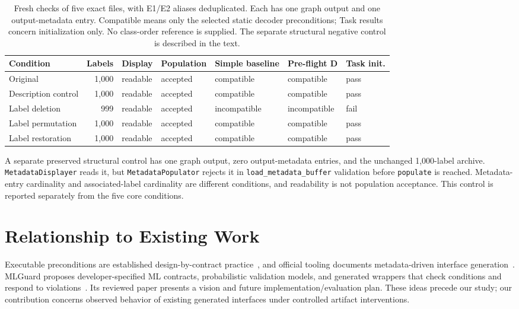 \documentclass[10pt,twocolumn,letterpaper]{article}
\newcommand{\code}[1]{\texttt{#1}}
\begin{document}
\begin{table}[t]
\centering\small
\setlength{\tabcolsep}{7pt}
\begin{tabular}{@{}lrlllll@{}}
\toprule
Condition & Labels & Display & Population & Simple baseline & Pre-flight D & Task init.\\
\midrule
Original & 1,000 & readable & accepted & compatible & compatible & pass\\
Description control & 1,000 & readable & accepted & compatible & compatible & pass\\
Label deletion & 999 & readable & accepted & incompatible & incompatible & fail\\
Label permutation & 1,000 & readable & accepted & compatible & compatible & pass\\
Label restoration & 1,000 & readable & accepted & compatible & compatible & pass\\
\bottomrule
\end{tabular}
\caption{Fresh checks of five exact files, with E1/E2 aliases deduplicated. Each has one graph output and one output-metadata entry. Compatible means only the selected static decoder preconditions; Task results concern initialization only. No class-order reference is supplied. The separate structural negative control is described in the text.}
\label{tab:baseline}
\end{table}

A separate preserved structural control has one graph output, zero output-metadata entries, and the unchanged 1,000-label archive. \code{MetadataDisplayer} reads it, but \code{MetadataPopulator} rejects it in \code{load\_metadata\_buffer} validation before \code{populate} is reached. Metadata-entry cardinality and associated-label cardinality are different conditions, and readability is not population acceptance. This control is reported separately from the five core conditions.

\section{Relationship to Existing Work}
Executable preconditions are established design-by-contract practice~\cite{meyer}, and official tooling documents metadata-driven interface generation~\cite{codegen-doc}. MLGuard proposes developer-specified ML contracts, probabilistic validation models, and generated wrappers that check conditions and respond to violations~\cite{mlguard}. Its reviewed paper presents a vision and future implementation/evaluation plan. These ideas precede our study; our contribution concerns observed behavior of existing generated interfaces under controlled artifact interventions.
\end{document}
